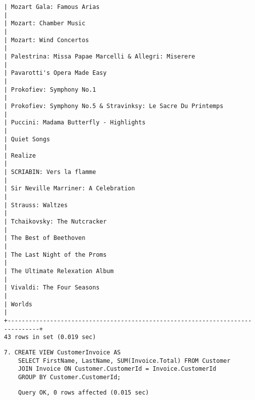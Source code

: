 \documentclass{article}
\begin{document}
\begin{lstlisting}[xleftmargin=-0.22in]
| Mozart Gala: Famous Arias                                                     |
| Mozart: Chamber Music                                                         |
| Mozart: Wind Concertos                                                        |
| Palestrina: Missa Papae Marcelli & Allegri: Miserere                          |
| Pavarotti's Opera Made Easy                                                   |
| Prokofiev: Symphony No.1                                                      |
| Prokofiev: Symphony No.5 & Stravinksy: Le Sacre Du Printemps                  |
| Puccini: Madama Butterfly - Highlights                                        |
| Quiet Songs                                                                   |
| Realize                                                                       |
| SCRIABIN: Vers la flamme                                                      |
| Sir Neville Marriner: A Celebration                                           |
| Strauss: Waltzes                                                              |
| Tchaikovsky: The Nutcracker                                                   |
| The Best of Beethoven                                                         |
| The Last Night of the Proms                                                   |
| The Ultimate Relexation Album                                                 |
| Vivaldi: The Four Seasons                                                     |
| Worlds                                                                        |
+-------------------------------------------------------------------------------+
43 rows in set (0.019 sec)
\end{lstlisting}
\begin{lstlisting}
7. CREATE VIEW CustomerInvoice AS
    SELECT FirstName, LastName, SUM(Invoice.Total) FROM Customer
    JOIN Invoice ON Customer.CustomerId = Invoice.CustomerId
    GROUP BY Customer.CustomerId;
\end{lstlisting}
\begin{lstlisting}
    Query OK, 0 rows affected (0.015 sec)
\end{lstlisting}
\end{document}
